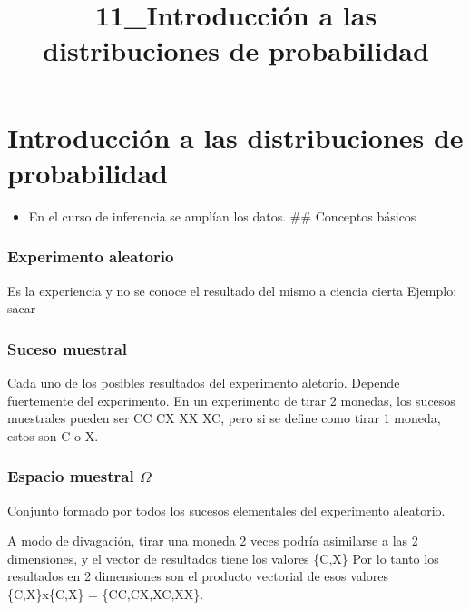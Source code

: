 \documentclass[
]{article}
\title{11\_Introducción a las distribuciones de probabilidad}
\author{}
\date{\vspace{-2.5em}}
\providecommand{\tightlist}{%
  \setlength{\itemsep}{0pt}\setlength{\parskip}{0pt}}
\begin{document}
\maketitle

\hypertarget{introducciuxf3n-a-las-distribuciones-de-probabilidad}{%
\section{Introducción a las distribuciones de
probabilidad}\label{introducciuxf3n-a-las-distribuciones-de-probabilidad}}

\begin{itemize}
\tightlist
\item
  En el curso de inferencia se amplían los datos. \#\# Conceptos básicos
\end{itemize}

\hypertarget{experimento-aleatorio}{%
\subsubsection{Experimento aleatorio}\label{experimento-aleatorio}}

Es la experiencia y no se conoce el resultado del mismo a ciencia cierta
Ejemplo: sacar

\hypertarget{suceso-muestral}{%
\subsubsection{Suceso muestral}\label{suceso-muestral}}

Cada uno de los posibles resultados del experimento aletorio. Depende
fuertemente del experimento. En un experimento de tirar 2 monedas, los
sucesos muestrales pueden ser CC CX XX XC, pero si se define como tirar
1 moneda, estos son C o X.

\hypertarget{espacio-muestral-omega}{%
\subsubsection{\texorpdfstring{Espacio muestral
\(\Omega\)}{Espacio muestral \textbackslash Omega}}\label{espacio-muestral-omega}}

Conjunto formado por todos los sucesos elementales del experimento
aleatorio.

A modo de divagación, tirar una moneda 2 veces podría asimilarse a las 2
dimensiones, y el vector de resultados tiene los valores \{C,X\} Por lo
tanto los resultados en 2 dimensiones son el producto vectorial de esos
valores \{C,X\}x\{C,X\} = \{CC,CX,XC,XX\}.
\end{document}
